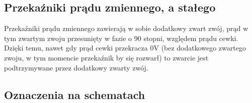 \documentclass{article}
\begin{document}
\subsection{Przekaźniki prądu zmiennego, a stałego}
Przekaźniki prądu zmiennego zawierają w sobie dodatkowy zwart zwój, prąd w tym zwartym zwoju przesunięty w fazie o 90 stopni,
względem prądu cewki. Dzięki temu, nawet gdy prąd cewki przekracza 0V (bez dodatkowego zwartego zwoju, w tym momencie przekaźnik by się rozwarł)
to zwarcie jest podtrzymywane przez dodatkowy zwarty zwój.
\subsection{Oznaczenia na schematach}
\end{document}
